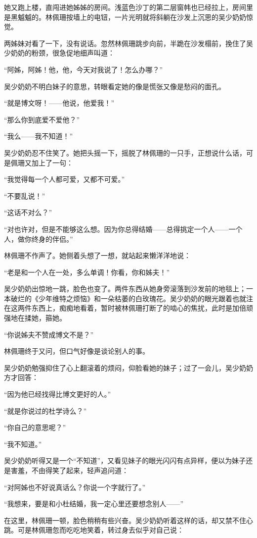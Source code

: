 \par 她又跑上楼，直闯进她姊姊的房间。浅蓝色沙丁的第二层窗帏也已经拉上，房间里是黑魆魆的。林佩珊按墙上的电钮，一片光明就将斜躺在沙发上沉思的吴少奶奶惊觉。
\par 两姊妹对看了一下，没有说话。忽然林佩珊跳步向前，半跪在沙发榻前，挽住了吴少奶奶的粉颈，很急促地细声叫道：
\par “阿姊，阿姊！他，他，今天对我说了！怎么办哪？”
\par 吴少奶奶不明白妹子的意思，转眼看定她的像是慌张又像是愁闷的面孔。
\par “就是博文呀！——他说，他爱我！”
\par “那么你到底爱不爱他？”
\par “我么——我不知道！”
\par 吴少奶奶忍不住笑了。她把头摇一下，摇脱了林佩珊的一只手，正想说什么话，可是佩珊又加上了一句：
\par “我觉得每一个人都可爱，又都不可爱。”
\par “不要乱说！”
\par “这话不对么？”
\par “对也许对，但是不能够这么想。因为你总得结婚——总得挑定一个人——一个人，做你终身的伴侣。”
\par 林佩珊不作声了。她侧着头想了一想，就站起来懒洋洋地说：
\par “老是和一个人在一处，多么单调！你看，你和姊夫！”
\par 吴少奶奶出惊地一跳，脸色也变了。两件东西从她身旁滚落到沙发前的地毯上；一本破烂的《少年维特之烦恼》和一朵枯萎的白玫瑰花。吴少奶奶的眼光跟着也就注在这两件东西上，痴痴地看着，暂时被林佩珊打断了的啮心的焦扰，此时是加倍顽强地在揉她，箍她。
\par “你说姊夫不赞成博文不是？”
\par 林佩珊终于又问，但口气好像是谈论别人的事。
\par 吴少奶奶勉强抑住了心上翻滚着的烦闷，仰脸看她的妹子；过了一会儿，吴少奶奶方才回答：
\par “因为他已经找得比博文更好的人。”
\par “就是你说过的杜学诗么？”
\par “你自己的意思呢？”
\par “我不知道。”
\par 吴少奶奶听得又是一个“不知道”，又看见妹子的眼光闪闪有点异样，便以为妹子还是害羞，不由得笑了起来，轻声追问道：
\par “对阿姊也不好说真话么？你说一个字就行了。”
\par “我想来，要是和小杜结婚，我一定心里还要想念别人——”
\par 在这里，林佩珊一顿，脸色稍稍有些兴奋。吴少奶奶听着这样的话，却又禁不住心跳。可是林佩珊忽而吃吃地笑着，转过身去似乎对自己说：
